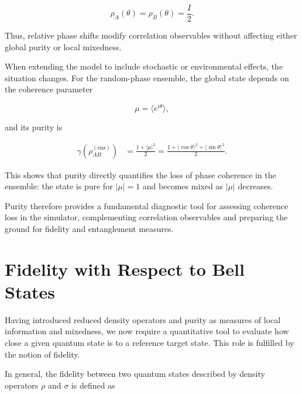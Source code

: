 \[
\rho_A(\theta)
=
\rho_B(\theta)
=
\frac{I}{2}.
\]

Thus, relative phase shifts modify correlation observables without affecting either global purity or local mixedness.

\medskip

When extending the model to include stochastic or environmental effects, the situation changes. For the random-phase ensemble, the global state depends on the coherence parameter

\begin{equation}
\mu
=
\langle e^{i\theta} \rangle,
\label{eq:coherence_parameter_mu}
\end{equation}

and its purity is

\begin{align} 
\gamma \left( \rho_{AB}^{(\mathrm{ens})} \right) 
&= 
\frac{1+|\mu|^2}{2} 
= 
\frac{ 1 + \langle \cos\theta \rangle^2 + \langle \sin\theta \rangle^2 }{2}. 
\label{eq:random_phase_ensemble_purity_mu} 
\end{align}

This shows that purity directly quantifies the loss of phase coherence in the ensemble: the state is pure for \( |\mu|=1 \) and becomes mixed as \( |\mu| \) decreases.

\medskip

Purity therefore provides a fundamental diagnostic tool for assessing coherence loss in the simulator, complementing correlation observables and preparing the ground for fidelity and entanglement measures.


\section{Fidelity with Respect to Bell States}

Having introduced reduced density operators and purity as measures of local information and mixedness, we now require a quantitative tool to evaluate how close a given quantum state is to a reference target state. This role is fulfilled by the notion of fidelity.

\medskip

In general, the fidelity between two quantum states described by density operators \( \rho \) and \( \sigma \) is defined as

